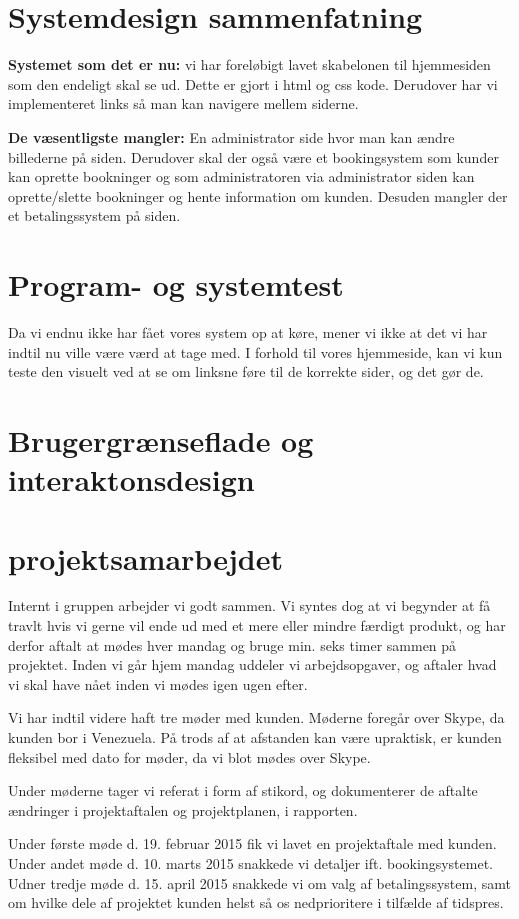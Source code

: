 \documentclass[12pt,a4paper]{article}
\begin{document}
\section{Systemdesign sammenfatning}
\textbf{Systemet som det er nu:}
vi har foreløbigt lavet skabelonen til hjemmesiden som den endeligt skal se ud. Dette er gjort i html og css kode. Derudover har vi implementeret links så man kan navigere mellem siderne. 

\textbf{De væsentligste mangler:}
En administrator side hvor man kan ændre billederne på siden. 
Derudover skal der også være et bookingsystem som kunder kan oprette bookninger og som administratoren via administrator siden kan oprette/slette bookninger og hente information om kunden. Desuden mangler der et betalingssystem på siden.
\newpage
\section{Program- og systemtest}
Da vi endnu ikke har fået vores system op at køre, mener vi ikke at det vi har indtil nu ville være værd at tage med. I forhold til vores hjemmeside, kan vi kun teste den visuelt ved at se om linksne føre til de korrekte sider, og det gør de.
\newpage
\section{Brugergrænseflade og interaktonsdesign}
\newpage
\section{projektsamarbejdet}
Internt i gruppen arbejder vi godt sammen. Vi syntes dog at vi begynder at få travlt hvis vi gerne vil ende ud med et mere eller mindre færdigt produkt, og har derfor aftalt at mødes hver mandag og bruge min. seks timer sammen på projektet. Inden vi går hjem mandag uddeler vi arbejdsopgaver, og aftaler hvad vi skal have nået inden vi mødes igen ugen efter. 

Vi har indtil videre haft tre møder med kunden. Møderne foregår over Skype, da kunden bor i Venezuela. På trods af at afstanden kan være upraktisk, er kunden fleksibel med dato for møder, da vi blot mødes over Skype.

Under møderne tager vi referat i form af stikord, og dokumenterer de aftalte ændringer i projektaftalen og projektplanen, i rapporten. 

Under første møde d. 19. februar 2015 fik vi lavet en projektaftale med kunden.
Under andet møde d. 10. marts 2015 snakkede vi detaljer ift. bookingsystemet.
Udner tredje møde d. 15. april 2015 snakkede vi om valg af betalingssystem, samt om hvilke dele af projektet kunden helst så os nedprioritere i tilfælde af tidspres.
\end{document}
